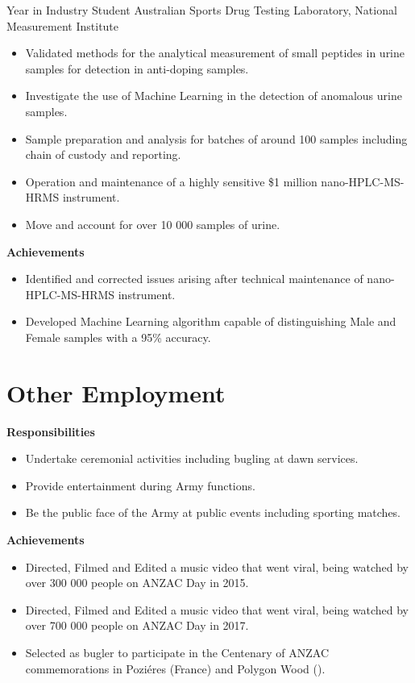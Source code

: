 {Year in Industry Student}
{Australian Sports Drug Testing Laboratory, National Measurement Institute}
{}{}
{%
  \begin{itemize}
    \item Validated methods for the analytical measurement of small peptides in urine samples
      for detection in anti-doping samples.
    \item Investigate the use of Machine Learning in the detection of anomalous urine samples.
    \item Sample preparation and analysis for batches of around 100 samples including chain of custody and reporting.
    \item Operation and maintenance of a highly sensitive \$1 million nano-HPLC-MS-HRMS instrument.
    \item Move and account for over 10 000 samples of urine.
  \end{itemize}
  \textbf{Achievements}
  \begin{itemize}
    \item Identified and corrected issues arising after technical maintenance of nano-HPLC-MS-HRMS instrument.
    \item Developed Machine Learning algorithm capable of distinguishing Male and Female samples with a 95\% accuracy.
  \end{itemize}
}
\vspace{1em}

\pagebreak
\section{Other Employment}

{}{}
{%
\textbf{Responsibilities}
\begin{itemize}
  \item Undertake ceremonial activities including bugling at dawn services.
  \item Provide entertainment during Army functions.
  \item Be the public face of the Army at public events including sporting matches.
\end{itemize}
\textbf{Achievements}
\begin{itemize}
  \item Directed, Filmed and Edited a music video  that went viral, being watched by over 300 000 people on ANZAC Day in 2015.
  \item Directed, Filmed and Edited a music video  that went viral, being watched by over 700 000 people on ANZAC Day in 2017.
  \item Selected as bugler to participate in the Centenary of ANZAC commemorations in Poziéres (France) and Polygon Wood ().
\end{itemize}
}
\vspace{1em}

